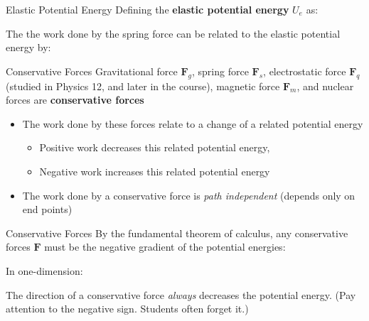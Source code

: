 \documentclass[12pt,compress,aspectratio=169]{beamer}
\begin{document}
\begin{frame}{Elastic Potential Energy}
  Defining the \textbf{elastic potential energy} $U_e$ as:


  The the work done by the spring force can be related to the elastic
  potential energy by:
  

\end{frame}



\begin{frame}{Conservative Forces}
  Gravitational force $\bm F_g$, spring force $\bm F_s$, electrostatic force
  $\bm F_q$ (studied in Physics 12, and later in the course), magnetic force
  $\bm F_m$, and nuclear forces are \textbf{conservative forces}
  \begin{itemize}
  \item The work done by these forces relate to a change of a related
    potential energy
    \begin{itemize}
    \item Positive work decreases this related potential energy,
    \item Negative work increases this related potential energy
    \end{itemize}
  \item The work done by a conservative force is \emph{path independent}
    (depends only on end points)
  \end{itemize}
\end{frame}



\begin{frame}{Conservative Forces}
  By the fundamental theorem of calculus, any conservative forces $\bm F$
  must be the negative gradient of the potential energies:


  In one-dimension:


  The direction of a conservative force \emph{always} decreases the potential
  energy. (Pay attention to the negative sign. Students often forget it.)
\end{frame}
\end{document}
